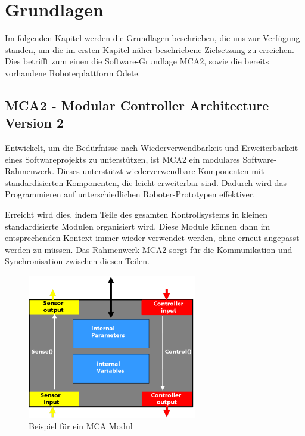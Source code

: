 \chapter{Grundlagen}
\label{grundlagen_cha}

Im folgenden Kapitel werden die Grundlagen beschrieben, die uns zur Verfügung standen, um die im ersten Kapitel näher beschriebene Zielsetzung zu erreichen. Dies betrifft zum einen die
Software-Grundlage MCA2, sowie die bereits vorhandene Roboterplattform Odete.

\section{MCA2 - Modular Controller Architecture Version 2}
\authorsection{\editoranne}

Entwickelt, um die Bedürfnisse nach Wiederverwendbarkeit und Erweiterbarkeit eines Softwareprojekts zu unterstützen, ist MCA2 ein modulares Software-Rahmenwerk. Dieses unterstützt wiederverwendbare Komponenten mit standardisierten Komponenten, die leicht erweiterbar sind. Dadurch wird das Programmieren auf unterschiedlichen Roboter-Prototypen effektiver.

Erreicht wird dies, indem Teile des gesamten Kontrollsystems in kleinen standardisierte Modulen organisiert wird. Diese Module können dann im entsprechenden Kontext immer wieder verwendet werden, ohne erneut angepasst werden zu müssen. Das Rahmenwerk MCA2 sorgt für die Kommunikation und Synchronisation zwischen diesen Teilen.

\begin{figure}[h]
	\center
	\includegraphics[scale=2.0]{graphics/mcamodule.png}
	\caption{\label{fig:MCA-Modul} Beispiel für ein MCA Modul}
\end{figure}

